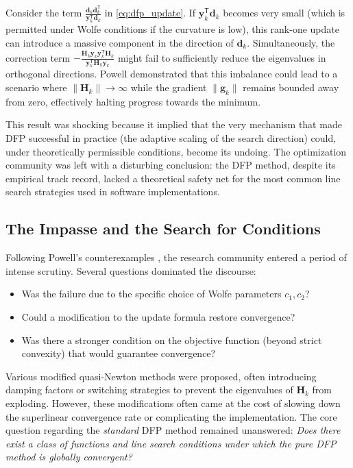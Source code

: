 \documentclass[12pt,a4paper]{article}  %
\newcounter{cite}
\theoremstyle{definition}
\numberwithin{equation}{section}
\newcommand{\HH}{\bm{H}}
\newcommand{\yy}{\bm{y}}
\newcommand{\trans}{{\scriptstyle{\mathsf{T}}}}
\newcommand{\dd}{\mathbf{d}}
\renewcommand{\ggg}{\mathbf{g}}
\begin{document}
Consider the term $\frac{\dd_k \dd_k^\trans}{\yy_k^\trans \dd_k}$ in \eqref{eq:dfp_update}. If $\yy_k^\trans \dd_k$ becomes very small (which is permitted under Wolfe conditions if the curvature is low), this rank-one update can introduce a massive component in the direction of $\dd_k$. Simultaneously, the correction term $-\frac{\HH_k \yy_k \yy_k^\trans \HH_k}{\yy_k^\trans \HH_k \yy_k}$ might fail to sufficiently reduce the eigenvalues in orthogonal directions. Powell demonstrated that this imbalance could lead to a scenario where $\|\HH_k\| \to \infty$ while the gradient $\|\ggg_k\|$ remains bounded away from zero, effectively halting progress towards the minimum.

This result was shocking because it implied that the very mechanism that made DFP successful in practice (the adaptive scaling of the search direction) could, under theoretically permissible conditions, become its undoing. The optimization community was left with a disturbing conclusion: the DFP method, despite its empirical track record, lacked a theoretical safety net for the most common line search strategies used in software implementations.

\subsection{The Impasse and the Search for Conditions}
Following Powell's counterexamples \cite{powell1984,powell1986}, the research community entered a period of intense scrutiny. Several questions dominated the discourse:
\begin{itemize}
    \item Was the failure due to the specific choice of Wolfe parameters $c_1, c_2$?
    \item Could a modification to the update formula restore convergence?
    \item Was there a stronger condition on the objective function (beyond strict convexity) that would guarantee convergence?
\end{itemize}

Various modified quasi-Newton methods were proposed, often introducing damping factors or switching strategies to prevent the eigenvalues of $\HH_k$ from exploding. However, these modifications often came at the cost of slowing down the superlinear convergence rate or complicating the implementation. The core question regarding the \textit{standard} DFP method remained unanswered: \textit{Does there exist a class of functions and line search conditions under which the pure DFP method is globally convergent?}
\end{document}
